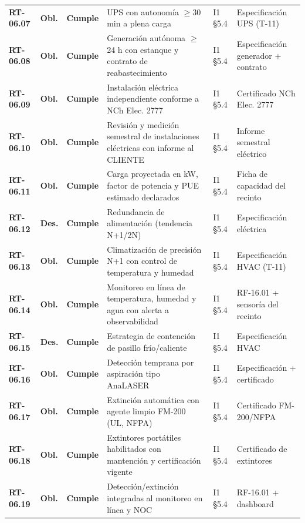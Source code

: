 \begin{small}
\begin{longtable}{@{}p{1.35cm} p{1.15cm} p{1.15cm} p{4.6cm} p{2.35cm} p{3.8cm}@{}}
\textbf{RT-06.07} & \textbf{Obl.} & \textbf{Cumple} & UPS con autonom\'ia $\geq$30 min a plena carga & I1 §5.4 & Especificaci\'on UPS (T-11) \\
\textbf{RT-06.08} & \textbf{Obl.} & \textbf{Cumple} & Generaci\'on aut\'onoma $\geq$24 h con estanque y contrato de reabastecimiento & I1 §5.4 & Especificaci\'on generador + contrato \\
\textbf{RT-06.09} & \textbf{Obl.} & \textbf{Cumple} & Instalaci\'on el\'ectrica independiente conforme a NCh Elec. 2777 & I1 §5.4 & Certificado NCh Elec. 2777 \\
\textbf{RT-06.10} & \textbf{Obl.} & \textbf{Cumple} & Revisi\'on y medici\'on semestral de instalaciones el\'ectricas con informe al CLIENTE & I1 §5.4 & Informe semestral el\'ectrico \\
\textbf{RT-06.11} & \textbf{Obl.} & \textbf{Cumple} & Carga proyectada en kW, factor de potencia y PUE estimado declarados & I1 §5.4 & Ficha de capacidad del recinto \\
\textbf{RT-06.12} & \textbf{Des.} & \textbf{Cumple} & Redundancia de alimentaci\'on (tendencia N+1/2N) & I1 §5.4 & Especificaci\'on el\'ectrica \\
\textbf{RT-06.13} & \textbf{Obl.} & \textbf{Cumple} & Climatizaci\'on de precisi\'on N+1 con control de temperatura y humedad & I1 §5.4 & Especificaci\'on HVAC (T-11) \\
\textbf{RT-06.14} & \textbf{Obl.} & \textbf{Cumple} & Monitoreo en l\'inea de temperatura, humedad y agua con alerta a observabilidad & I1 §5.4 & RF-16.01 + sensor\'ia del recinto \\
\textbf{RT-06.15} & \textbf{Des.} & \textbf{Cumple} & Estrategia de contenci\'on de pasillo fr\'io/caliente & I1 §5.4 & Especificaci\'on HVAC \\
\textbf{RT-06.16} & \textbf{Obl.} & \textbf{Cumple} & Detecci\'on temprana por aspiraci\'on tipo AnaLASER & I1 §5.4 & Especificaci\'on + certificado \\
\textbf{RT-06.17} & \textbf{Obl.} & \textbf{Cumple} & Extinci\'on autom\'atica con agente limpio FM-200 (UL, NFPA) & I1 §5.4 & Certificado FM-200/NFPA \\
\textbf{RT-06.18} & \textbf{Obl.} & \textbf{Cumple} & Extintores port\'atiles habilitados con mantenci\'on y certificaci\'on vigente & I1 §5.4 & Certificado de extintores \\
\textbf{RT-06.19} & \textbf{Obl.} & \textbf{Cumple} & Detecci\'on/extinci\'on integradas al monitoreo en l\'inea y NOC & I1 §5.4 & RF-16.01 + dashboard \\

\end{longtable}
\end{small}
